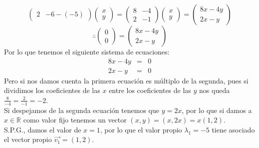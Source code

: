 \begin{itemize}
\begin{enumerate}
\begin{itemize}
\[\begin{pmatrix}
2 &-6-(-5)\end{pmatrix}\begin{pmatrix}x\\
y\end{pmatrix}=\begin{pmatrix}8 &-4\\
2 &-1\end{pmatrix}\begin{pmatrix}x\\
y\end{pmatrix}=\begin{pmatrix}8x-4y\\
2x-y\end{pmatrix}\]
\[\therefore \begin{pmatrix}0\\
0\end{pmatrix}=\begin{pmatrix}8x-4y\\
2x-y\end{pmatrix}\]
Por lo que tenemos el siguiente sistema de ecuaciones:
\begin{eqnarray*}
8x-4y&=&0\\
2x-y&=&0
\end{eqnarray*}
Pero si nos damos cuenta la primera ecuaci\'on es m\'ultiplo de la segunda, pues si dividimos los coeficientes de las $x$ entre los coeficientes de las $y$ nos queda $\displaystyle\frac{8}{-4}=\frac{2}{-1}=-2$.\\
Si despejamos de la segunda ecuaci\'on tenemos que $y=2x$, por lo que si damos a $x\in\mathbb{R}$ como valor fijo tenemos un vector $(x,y)=(x,2x)=x(1,2)$.\\
S.P.G., damos el valor de $x=1$, por lo que el valor propio $\lambda_1=-5$ tiene asociado el vector propio $\vec{v_1}=(1,2)$.


\end{itemize}
\end{enumerate}
\end{itemize}
